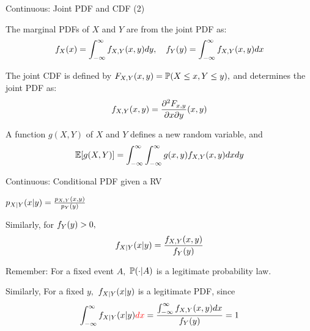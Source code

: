 \documentclass[handout,fleqn,aspectratio=169]{beamer}
\begin{document}
\begin{frame}{Continuous: Joint PDF and CDF (2)}

\plitemsep 0.1in
\bce
\item<2->[2.] The marginal PDFs of $X$ and $Y$ are from the joint PDF as: 
$$
f_X(x) = \int_{-\infty}^\infty f_{X,Y}(x,y) dy, \quad f_Y(y) = \int_{-\infty}^\infty f_{X,Y}(x,y) dx
$$

\item<3->[3.] The joint CDF is defined by $F_{X,Y}(x,y) = \mathbb{P}( X \le x, Y \le y ),$ and determines the joint PDF as:
$$
f_{X,Y}(x,y) = \frac{\partial^2 F_{x,y}}{\partial x \partial y} (x,y)
$$

\item<4->[4.] A function $g(X,Y)$ of $X$ and $Y$ defines a new random variable, and
$$
\mathbb{E}[ g(X,Y) ] = \int_{-\infty}^\infty \int_{-\infty}^\infty g(x,y) f_{X,Y}(x,y) dx dy
$$
\ece

\end{frame}

\begin{frame}{Continuous:  Conditional PDF given a RV}

\plitemsep 0.2in
\bci 

\item $p_{X|Y}(x|y) = \frac{p_{X,Y}(x,y)}{p_Y(y)}$

\item<2-> Similarly, for $f_Y(y) >0,$
$$
f_{X|Y}(x|y) = \frac{f_{X,Y}(x,y)}{f_Y(y)}
$$

\item<3-> Remember: For a fixed event $A,$ $\mathbb{P}( \cdot | A )$ is a legitimate probability law.

\item<4-> Similarly, For a fixed $y,$ $f_{X|Y}(x|y)$ is a legitimate PDF, since
$$
\int_{-\infty}^\infty f_{X|Y}(x|y) {\color{red} dx} = \frac{\int_{-\infty}^\infty f_{X,Y}(x,y) dx}{f_Y(y)} = 1
$$
\eci
\end{frame}




\end{document}

